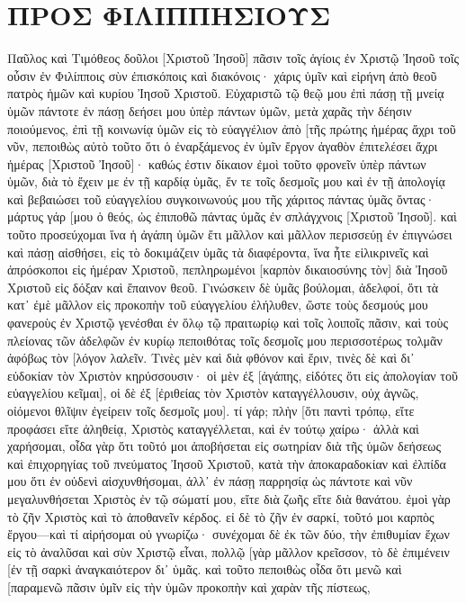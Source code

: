 \section{ΠΡΟΣ ΦΙΛΙΠΠΗΣΙΟΥΣ}
Παῦλος καὶ Τιμόθεος δοῦλοι [Χριστοῦ Ἰησοῦ] πᾶσιν τοῖς ἁγίοις ἐν Χριστῷ Ἰησοῦ τοῖς οὖσιν ἐν Φιλίπποις σὺν ἐπισκόποις καὶ διακόνοις· 
χάρις ὑμῖν καὶ εἰρήνη ἀπὸ θεοῦ πατρὸς ἡμῶν καὶ κυρίου Ἰησοῦ Χριστοῦ. 
Εὐχαριστῶ τῷ θεῷ μου ἐπὶ πάσῃ τῇ μνείᾳ ὑμῶν 
πάντοτε ἐν πάσῃ δεήσει μου ὑπὲρ πάντων ὑμῶν, μετὰ χαρᾶς τὴν δέησιν ποιούμενος, 
ἐπὶ τῇ κοινωνίᾳ ὑμῶν εἰς τὸ εὐαγγέλιον ἀπὸ [τῆς πρώτης ἡμέρας ἄχρι τοῦ νῦν, 
πεποιθὼς αὐτὸ τοῦτο ὅτι ὁ ἐναρξάμενος ἐν ὑμῖν ἔργον ἀγαθὸν ἐπιτελέσει ἄχρι ἡμέρας [Χριστοῦ Ἰησοῦ]· 
καθώς ἐστιν δίκαιον ἐμοὶ τοῦτο φρονεῖν ὑπὲρ πάντων ὑμῶν, διὰ τὸ ἔχειν με ἐν τῇ καρδίᾳ ὑμᾶς, ἔν τε τοῖς δεσμοῖς μου καὶ ἐν τῇ ἀπολογίᾳ καὶ βεβαιώσει τοῦ εὐαγγελίου συγκοινωνούς μου τῆς χάριτος πάντας ὑμᾶς ὄντας· 
μάρτυς γάρ [μου ὁ θεός, ὡς ἐπιποθῶ πάντας ὑμᾶς ἐν σπλάγχνοις [Χριστοῦ Ἰησοῦ]. 
καὶ τοῦτο προσεύχομαι ἵνα ἡ ἀγάπη ὑμῶν ἔτι μᾶλλον καὶ μᾶλλον περισσεύῃ ἐν ἐπιγνώσει καὶ πάσῃ αἰσθήσει, 
εἰς τὸ δοκιμάζειν ὑμᾶς τὰ διαφέροντα, ἵνα ἦτε εἰλικρινεῖς καὶ ἀπρόσκοποι εἰς ἡμέραν Χριστοῦ, 
πεπληρωμένοι [καρπὸν δικαιοσύνης τὸν] διὰ Ἰησοῦ Χριστοῦ εἰς δόξαν καὶ ἔπαινον θεοῦ. 
Γινώσκειν δὲ ὑμᾶς βούλομαι, ἀδελφοί, ὅτι τὰ κατ᾽ ἐμὲ μᾶλλον εἰς προκοπὴν τοῦ εὐαγγελίου ἐλήλυθεν, 
ὥστε τοὺς δεσμούς μου φανεροὺς ἐν Χριστῷ γενέσθαι ἐν ὅλῳ τῷ πραιτωρίῳ καὶ τοῖς λοιποῖς πᾶσιν, 
καὶ τοὺς πλείονας τῶν ἀδελφῶν ἐν κυρίῳ πεποιθότας τοῖς δεσμοῖς μου περισσοτέρως τολμᾶν ἀφόβως τὸν [λόγον λαλεῖν. 
Τινὲς μὲν καὶ διὰ φθόνον καὶ ἔριν, τινὲς δὲ καὶ δι᾽ εὐδοκίαν τὸν Χριστὸν κηρύσσουσιν· 
οἱ μὲν ἐξ [ἀγάπης, εἰδότες ὅτι εἰς ἀπολογίαν τοῦ εὐαγγελίου κεῖμαι], 
οἱ δὲ ἐξ [ἐριθείας τὸν Χριστὸν καταγγέλλουσιν, οὐχ ἁγνῶς, οἰόμενοι θλῖψιν ἐγείρειν τοῖς δεσμοῖς μου]. 
τί γάρ; πλὴν [ὅτι παντὶ τρόπῳ, εἴτε προφάσει εἴτε ἀληθείᾳ, Χριστὸς καταγγέλλεται, καὶ ἐν τούτῳ χαίρω· ἀλλὰ καὶ χαρήσομαι, 
οἶδα γὰρ ὅτι τοῦτό μοι ἀποβήσεται εἰς σωτηρίαν διὰ τῆς ὑμῶν δεήσεως καὶ ἐπιχορηγίας τοῦ πνεύματος Ἰησοῦ Χριστοῦ, 
κατὰ τὴν ἀποκαραδοκίαν καὶ ἐλπίδα μου ὅτι ἐν οὐδενὶ αἰσχυνθήσομαι, ἀλλ᾽ ἐν πάσῃ παρρησίᾳ ὡς πάντοτε καὶ νῦν μεγαλυνθήσεται Χριστὸς ἐν τῷ σώματί μου, εἴτε διὰ ζωῆς εἴτε διὰ θανάτου. 
ἐμοὶ γὰρ τὸ ζῆν Χριστὸς καὶ τὸ ἀποθανεῖν κέρδος. 
εἰ δὲ τὸ ζῆν ἐν σαρκί, τοῦτό μοι καρπὸς ἔργου—καὶ τί αἱρήσομαι οὐ γνωρίζω· 
συνέχομαι δὲ ἐκ τῶν δύο, τὴν ἐπιθυμίαν ἔχων εἰς τὸ ἀναλῦσαι καὶ σὺν Χριστῷ εἶναι, πολλῷ [γὰρ μᾶλλον κρεῖσσον, 
τὸ δὲ ἐπιμένειν [ἐν τῇ σαρκὶ ἀναγκαιότερον δι᾽ ὑμᾶς. 
καὶ τοῦτο πεποιθὼς οἶδα ὅτι μενῶ καὶ [παραμενῶ πᾶσιν ὑμῖν εἰς τὴν ὑμῶν προκοπὴν καὶ χαρὰν τῆς πίστεως, 
